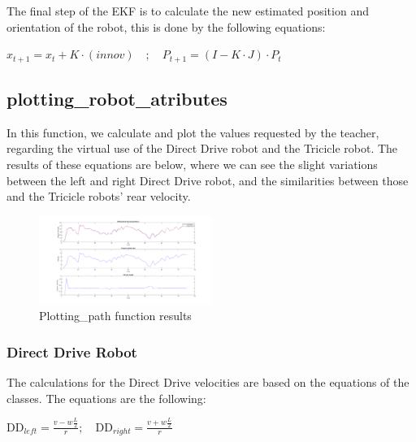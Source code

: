 \documentclass[runningheads]{llncs}
\begin{document}
The final step of the EKF is to calculate the new estimated position and orientation of the robot, this is done by the following equations:
\\ 
\begin{center}
\begin{math}
    x_{t+1}=x_t+K\cdot(innov) \quad ; \quad P_{t+1}=(I-K\cdot J)\cdot P_t
\end{math}
\end{center}

\subsection*{plotting\_robot\_atributes}
In this function, we calculate and plot the values requested by the teacher, regarding the virtual use of the Direct Drive robot and the Tricicle robot. 
The results of these equations are below, where we can see the slight variations between the left and right Direct Drive robot, and the similarities between those and the Tricicle robots' rear velocity.

\begin{figure}
    \centering
    \includegraphics[width=0.5\textwidth]{plotting_robot_vels.png}
    \caption{Plotting\_path function results}
    \label{plotting_robot_fig}
\end{figure}




\subsubsection*{Direct Drive Robot}
The calculations for the Direct Drive velocities are based on the equations of the classes. The equations are the following:
\\
\begin{center}
    
    \begin{math}
        \text{DD}_{left} = \frac{v - w\frac{L}{2}} {r}; \quad
        \text{DD}_{right} = \frac{v + w\frac{L}{2}} {r}
    \end{math}
\end{center}
\end{document}
